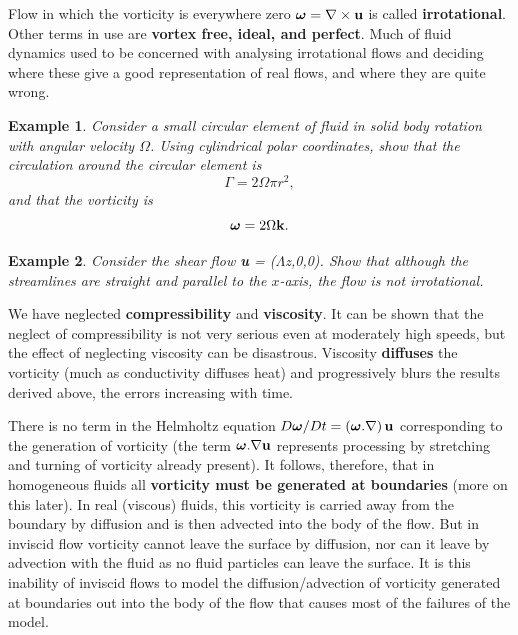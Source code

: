 \documentclass[twoside,a4paper,11pt]{report}
\newtheorem{exmp}{Example}}
\begin{document}
Flow in which the vorticity is everywhere zero ${\bm\omega} =\nabla \times {{\bf 
u}}$ is called \textbf{irrotational}. Other terms in use are \textbf{vortex 
free, ideal, and perfect}. Much of fluid dynamics used to be concerned with 
analysing irrotational flows and deciding where these give a good 
representation of real flows, and where they are quite wrong.

\begin{exmp}
Consider a small circular element of fluid in solid body rotation with angular velocity $\Omega$. Using 
cylindrical polar coordinates, show that the circulation around the circular element 
is
\[ \Gamma = 2\Omega \pi r^2, \]
and that the vorticity is
\[ \bm\omega = 2\Omega{\bf k}. \]
\end{exmp}


\begin{exmp}
Consider the shear flow \textbf{u} = ($\Lambda $z,0,0). Show that although the 
streamlines are straight and parallel to the $x$-axis, the flow is not 
irrotational.
\end{exmp}


We have neglected \textbf{compressibility} and \textbf{viscosity}. It can be 
shown that the neglect of compressibility is not very serious even at 
moderately high speeds, but the effect of neglecting viscosity can be 
disastrous. Viscosity \textbf{diffuses} the vorticity (much as conductivity 
diffuses heat) and progressively blurs the results derived above, the errors 
increasing with time.

There is no term in the Helmholtz equation ${D{\bm\omega}}/{Dt}=\left( {{\bm\omega}. \nabla 
} \right){{\bf u}}$ corresponding to the generation of vorticity (the 
term ${\bm\omega}. \nabla {{\bf u}}$ represents processing by stretching and 
turning of vorticity already present). It follows, therefore, that in 
homogeneous fluids all \textbf{vorticity must be generated at boundaries 
}(more on this later). In real (viscous) fluids, this vorticity is carried 
away from the boundary by diffusion and is then advected into the body of 
the flow. But in inviscid flow vorticity cannot leave the surface by 
diffusion, nor can it leave by advection with the fluid as no fluid 
particles can leave the surface. It is this inability of inviscid flows to 
model the diffusion/advection of vorticity generated at boundaries out into 
the body of the flow that causes most of the failures of the model.
\end{document}
